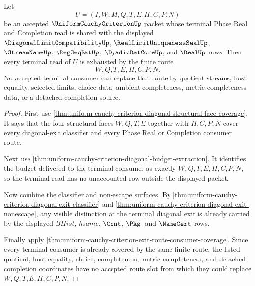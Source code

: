 \begin{theorem}
\label{thm:uniform-cauchy-criterion-diagonal-terminal-route-exhaustion}
Let
$$
U=(I,W,M,Q,T,E,H,C,P,N)
$$
be an accepted $\UniformCauchyCriterionUp$ packet whose terminal Phase Real and Completion read is shared with the displayed $\DiagonalLimitCompatibilityUp$, $\RealLimitUniquenessSealUp$, $\StreamNameUp$, $\RegSeqRatUp$, $\DyadicRatCoreUp$, and $\RealUp$ rows. Then every terminal read of $U$ is exhausted by the finite route
$$
W,Q,T,E,H,C,P,N.
$$
No accepted terminal consumer can replace that route by quotient streams, host equality, selected limits, choice data, ambient completeness, metric-completeness data, or a detached completion source.
\end{theorem}
\begin{proof}
First use \autoref{thm:uniform-cauchy-criterion-diagonal-structural-face-coverage}. It says that the four structural faces $W,Q,T,E$ together with $H,C,P,N$ cover every diagonal-exit classifier and every Phase Real or Completion consumer route.

Next use \autoref{thm:uniform-cauchy-criterion-diagonal-budget-extraction}. It identifies the budget delivered to the terminal consumer as exactly $W,Q,T,E,H,C,P,N$, so the terminal read has no unaccounted row outside the displayed packet.

Now combine the classifier and non-escape surfaces. By \autoref{thm:uniform-cauchy-criterion-diagonal-exit-classifier} and \autoref{thm:uniform-cauchy-criterion-diagonal-exit-nonescape}, any visible distinction at the terminal diagonal exit is already carried by the displayed $BHist$, $hsame$, $\Cont$, $\Pkg$, and $\NameCert$ rows.

Finally apply \autoref{thm:uniform-cauchy-criterion-exit-route-consumer-coverage}. Since every terminal consumer is already covered by the same finite route, the listed quotient, host-equality, choice, completeness, metric-completeness, and detached-completion coordinates have no accepted route slot from which they could replace $W,Q,T,E,H,C,P,N$.
\end{proof}

